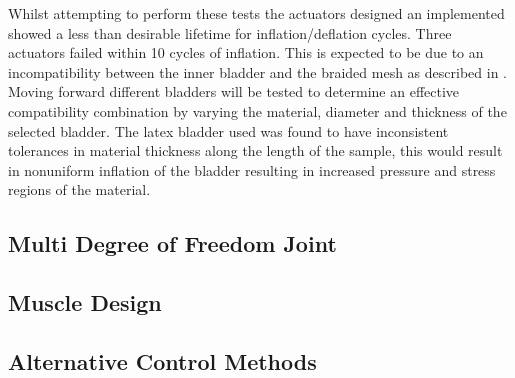 \documentclass[11pt,a4paper]{article}
\begin{document}
Whilst attempting to perform these tests the actuators designed an implemented showed a less than desirable lifetime for inflation/deflation cycles. Three actuators failed within 10 cycles of inflation. This is expected to be due to an incompatibility between the inner bladder and the braided mesh as described in \cite{andrikopoulos_nikolakopoulos_2017}. Moving forward different bladders will be tested to determine an effective compatibility combination by varying the material, diameter and thickness of the selected bladder. The latex bladder used was found to have inconsistent tolerances in material thickness along the length of the sample, this would result in nonuniform inflation of the bladder resulting in increased pressure and stress regions of the material.

\subsection{Multi Degree of Freedom Joint}
\label{sub:two_dof_joint}

\subsection{Muscle Design}
\label{sub:future_muscle_design}

\subsection{Alternative Control Methods}
\label{sub:alternative_control_methods}
\end{document}
